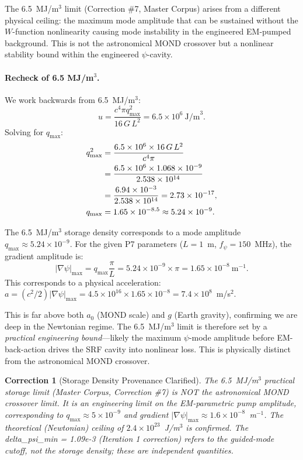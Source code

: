 \documentclass[aps,prd,twocolumn,superscriptaddress,nofootinbib]{revtex4-2}
\newtheorem{correction}{Correction}
\begin{document}
The 6.5~MJ/m$^3$ limit (Correction \#7, Master Corpus) arises from a
different physical ceiling: the maximum mode amplitude that can be sustained
without the $W$-function nonlinearity causing mode instability in the
engineered EM-pumped background.  This is not the astronomical MOND crossover
but a nonlinear stability bound within the engineered $\psi$-cavity.

\paragraph{Recheck of 6.5 MJ/m$^3$.}
We work backwards from 6.5~MJ/m$^3$:
\begin{equation}
u = \frac{c^4\pi q_{\max}^2}{16\,G\,L^2} = 6.5\times10^6~\text{J/m}^3.
\end{equation}
Solving for $q_{\max}$:
\begin{align}
q_{\max}^2 &= \frac{6.5\times10^6\times16\,G\,L^2}{c^4\pi} \notag\\
&= \frac{6.5\times10^6\times1.068\times10^{-9}}{2.538\times10^{14}} \notag\\
&= \frac{6.94\times10^{-3}}{2.538\times10^{14}} = 2.73\times10^{-17}, \notag\\
q_{\max} &= 1.65\times10^{-8.5} \approx 5.24\times10^{-9}.
\end{align}

The 6.5~MJ/m$^3$ storage density corresponds to a mode amplitude
$q_{\max} \approx 5.24\times10^{-9}$.  For the given P7 parameters
($L = 1$~m, $f_\psi = 150$~MHz), the gradient amplitude is:
\begin{equation}
|\nabla\psi|_{\max} = q_{\max}\frac{\pi}{L} = 5.24\times10^{-9}\times\pi
= 1.65\times10^{-8}~\text{m}^{-1}.
\end{equation}
This corresponds to a physical acceleration:
$a = (c^2/2)|\nabla\psi|_{\max} = 4.5\times10^{16}\times1.65\times10^{-8}
= 7.4\times10^8$~m/s$^2$.

This is far above both $a_0$ (MOND scale) and $g$ (Earth gravity),
confirming we are deep in the Newtonian regime.  The 6.5~MJ/m$^3$ limit
is therefore set by a \emph{practical engineering bound}---likely the
maximum $\psi$-mode amplitude before EM-back-action drives the SRF cavity
into nonlinear loss.  This is physically distinct from the astronomical
MOND crossover.

\begin{correction}[Storage Density Provenance Clarified]
The 6.5~MJ/m$^3$ practical storage limit (Master Corpus, Correction \#7)
is NOT the astronomical MOND crossover limit.  It is an engineering limit on
the EM-parametric pump amplitude, corresponding to $q_{\max} \approx 5\times10^{-9}$
and gradient $|\nabla\psi|_{\max} \approx 1.6\times10^{-8}$~m$^{-1}$.  The
theoretical (Newtonian) ceiling of $2.4\times10^{23}$~J/m$^3$ is confirmed.
The delta_psi_min = 1.09e-3 (Iteration 1 correction) refers to the
\emph{guided-mode cutoff}, not the storage density; these are independent
quantities.
\end{correction}
\end{document}
